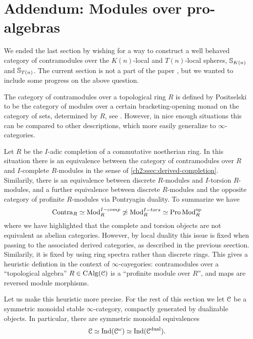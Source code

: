 
\section{Addendum: Modules over pro-algebras}
\label{ch2:addendum}

We ended the last section by wishing for a way to construct a well behaved category of contramodules over the $K(n)$-local and $T(n)$-local spheres, $\mathbb{S}_{K(n)}$ and $\mathbb{S}_{T(n)}$. The current section is not a part of the paper \cite{aambo_2024_positselski}, but we wanted to include some progress on the above question. 

The category of contramodules over a topological ring $R$ is defined by Positselski to be the category of modules over a certain bracketing-opening monad on the category of sets, determined by $R$, see \cite{positselski_2022_contramodules}. However, in nice enough situations this can be compared to other descriptions, which more easily generalize to $\infty$-categories. 

\begin{remark}
    \label{ch2:rm:contra-as-op-pro-modules}
    Let $R$ be the $I$-adic completion of a commutative noetherian ring. In this situation there is an equivalence between the category of contramodules over $R$ and $I$-complete $R$-modules in the sense of \cref{ch2:ssec:derived-completion}. Similarily, there is an equivalence between discrete $R$-modules and $I$-torsion $R$-modules, and a further equivalence between discrete $R$-modules and the opposite category of profinite $R$-modules via Pontryagin duality. To summarize we have  
    \[\mathrm{Contra}_R \simeq \mathrm{Mod}_R^{I-comp} \not\simeq \mathrm{Mod}_R^{I-tors}\simeq \operatorname{Pro}\mathrm{Mod}_R^{\mathrm{op}}\]
    where we have highlighted that the complete and torsion objects are not equivalent as abelian categories. However, by local duality this issue is fixed when passing to the associated derived categories, as described in the previous seection. Similarily, it is fixed by using ring spectra rather than discrete rings. This gives a heuristic defintion in the context of $\infty$-cayegories: contramodules over a ``topological algebra'' $R\in \operatorname{CAlg}(\EuScript{C})$ is a ``profinite module over $R$'', and maps are reversed module morphisms.  
\end{remark}

Let us make this heuristic more precise. For the rest of this section we let $\EuScript{C}$ be a symmetric monoidal stable $\infty$-category, compactly generated by dualizable objects. In particular, there are symmetric monoidal equivalences 
\[\EuScript{C} \simeq \operatorname{Ind}(\EuScript{C}^\omega) \simeq \operatorname{Ind}(\EuScript{C}^{\mathrm{dual}}).\]

